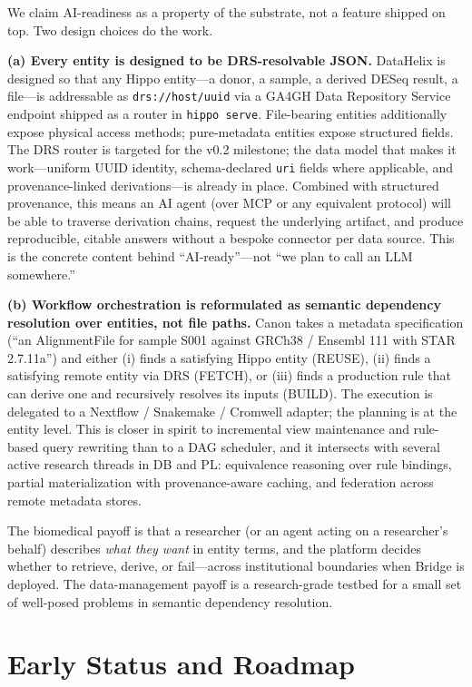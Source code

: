\documentclass[sigconf, nonacm]{acmart}
\begin{document}
We claim AI-readiness as a property of the substrate, not a feature shipped on top. Two design choices do the work.

\textbf{(a) Every entity is designed to be DRS-resolvable JSON.} DataHelix is designed so that any Hippo entity---a donor, a sample, a derived DESeq result, a file---is addressable as \texttt{drs://host/uuid} via a GA4GH Data Repository Service endpoint shipped as a router in \texttt{hippo serve}. File-bearing entities additionally expose physical access methods; pure-metadata entities expose structured fields. The DRS router is targeted for the v0.2 milestone; the data model that makes it work---uniform UUID identity, schema-declared \texttt{uri} fields where applicable, and provenance-linked derivations---is already in place. Combined with structured provenance, this means an AI agent (over MCP or any equivalent protocol) will be able to traverse derivation chains, request the underlying artifact, and produce reproducible, citable answers without a bespoke connector per data source. This is the concrete content behind ``AI-ready''---not ``we plan to call an LLM somewhere.''

\textbf{(b) Workflow orchestration is reformulated as semantic dependency resolution over entities, not file paths.} Canon takes a metadata specification (``an AlignmentFile for sample S001 against GRCh38 / Ensembl 111 with STAR 2.7.11a'') and either (i) finds a satisfying Hippo entity (REUSE), (ii) finds a satisfying remote entity via DRS (FETCH), or (iii) finds a production rule that can derive one and recursively resolves its inputs (BUILD). The execution is delegated to a Nextflow / Snakemake / Cromwell adapter; the planning is at the entity level. This is closer in spirit to incremental view maintenance and rule-based query rewriting than to a DAG scheduler, and it intersects with several active research threads in DB and PL: equivalence reasoning over rule bindings, partial materialization with provenance-aware caching, and federation across remote metadata stores.

The biomedical payoff is that a researcher (or an agent acting on a researcher's behalf) describes \emph{what they want} in entity terms, and the platform decides whether to retrieve, derive, or fail---across institutional boundaries when Bridge is deployed. The data-management payoff is a research-grade testbed for a small set of well-posed problems in semantic dependency resolution.

\section{Early Status and Roadmap}
\end{document}
